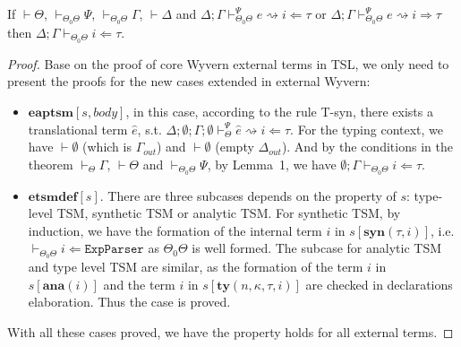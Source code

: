 \documentclass{sig-alternate}[10pt]
\begin{document}
\begin{theorem}
If $\vdash\Theta$, $\vdash_{\Theta_0\Theta}\Psi$, $\vdash_{\Theta_0\Theta}\Gamma$, $\vdash\Delta$ and $\Delta;\Gamma\vdash_{\Theta_0\Theta}^{\Psi} e\rightsquigarrow i\Leftarrow\tau$ or $\Delta;\Gamma\vdash_{\Theta_0\Theta}^{\Psi} e\rightsquigarrow i\Rightarrow\tau$ then $\Delta;\Gamma\vdash_{\Theta_0\Theta} i\Leftarrow\tau$.
\end{theorem}
\begin{proof}
Base on the proof of core Wyvern external terms in TSL, we only need to present the proofs for the new cases extended in external Wyvern:
\begin{itemize}
\item $\mathbf{eaptsm}[s,body]$, in this case, according to the rule T-syn, there exists a translational term $\hat{e}$, s.t. $\Delta;\emptyset;\Gamma;\emptyset\vdash_{\Theta}^{\Psi}\hat{e}\rightsquigarrow i\Leftarrow \tau$. For the typing context, we have $\vdash\emptyset$ (which is $\Gamma_{out}$) and $\vdash\emptyset$ (empty $\Delta_{out}$). And by the conditions in the theorem $\vdash_{\Theta}\Gamma$, $\vdash\Theta$ and $\vdash_{\Theta_0\Theta}\Psi$, by Lemma~1, we have $\emptyset;\Gamma\vdash_{\Theta_0\Theta}i\Leftarrow\tau$. 
\item $\mathbf{etsmdef}[s]$. There are three subcases depends on the property of $s$: type-level TSM, synthetic TSM or analytic TSM. For synthetic TSM, by induction, we have the formation of the internal term $i$ in $s[\mathbf{syn}(\tau,i)]$, i.e. $\vdash_{\Theta_0\Theta}i\Leftarrow \mathtt{ExpParser}$ as $\Theta_0\Theta$ is well formed. The subcase for analytic TSM and type level TSM are similar, as the formation of the term $i$ in $s[\mathbf{ana}(i)]$ and the term $i$ in $s[\mathbf{ty}(n,\kappa,\tau,i)]$ are checked in declarations elaboration. Thus the case is proved.
\end{itemize}
With all these cases proved, we have the property holds for all external terms.
\end{proof}
\end{document}
